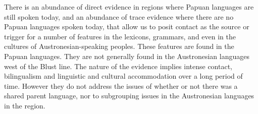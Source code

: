 There is an abundance of direct evidence in regions where Papuan
languages are still spoken today,
and an abundance of trace evidence where there are no Papuan
languages spoken today, that allow us to posit contact as the source or trigger for a
number of features in the lexicons,
grammars, and even in the cultures of Austronesian-speaking peoples.
These features are found in the Papuan languages.
They are not generally found in the Austronesian languages west
of the Blust line.
The nature of the evidence implies intense contact,
bilingualism and linguistic and cultural accommodation over a
long period of time.
However they do not address the issues of whether or not there
was a shared parent language,
nor to subgrouping issues in the Austronesian languages in the region.
